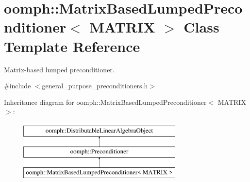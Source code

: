 \hypertarget{classoomph_1_1MatrixBasedLumpedPreconditioner}{}\section{oomph\+:\+:Matrix\+Based\+Lumped\+Preconditioner$<$ M\+A\+T\+R\+IX $>$ Class Template Reference}
\label{classoomph_1_1MatrixBasedLumpedPreconditioner}


Matrix-\/based lumped preconditioner.  




{\ttfamily \#include $<$general\+\_\+purpose\+\_\+preconditioners.\+h$>$}

Inheritance diagram for oomph\+:\+:Matrix\+Based\+Lumped\+Preconditioner$<$ M\+A\+T\+R\+IX $>$\+:\begin{figure}[H]
\begin{center}
\leavevmode
\includegraphics[height=3.000000cm]{classoomph_1_1MatrixBasedLumpedPreconditioner}
\end{center}
\end{figure}
